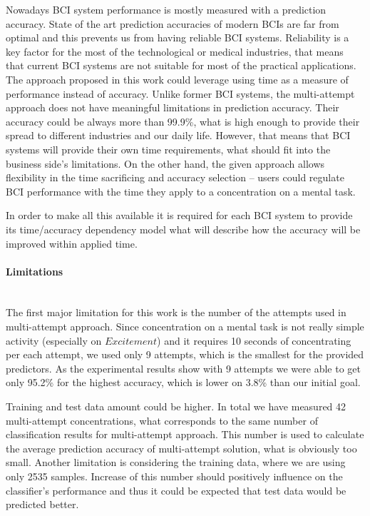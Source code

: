 \documentclass[12pt]{article}
\theoremstyle{definition}
\begin{document}
Nowadays BCI system performance is mostly measured with a prediction accuracy. State of the art prediction accuracies of modern BCIs are far from optimal and this prevents us from having reliable BCI systems. Reliability is a key factor for the most of the technological or medical industries, that means that current BCI systems are not suitable for most of the practical applications. The approach proposed in this work could leverage using time as a measure of performance instead of accuracy. Unlike former BCI systems, the multi-attempt approach does not have meaningful limitations in prediction accuracy. Their accuracy could be always more than 99.9\%, what is high enough to  provide their spread to different industries and our daily life. However, that means that BCI systems will provide their own time requirements, what should fit into the business side's limitations. On the other hand, the given approach allows flexibility in the time sacrificing and accuracy selection -- users could regulate BCI performance with the time they apply to a concentration on a mental task.

In order to make all this available it is required for each BCI system to provide its time/accuracy dependency model what will describe how the accuracy will be improved within applied time. 


\paragraph{Limitations}~\\

The first major limitation for this work is the number of the attempts used in multi-attempt approach. Since concentration on a mental task is not really simple activity (especially on $Excitement$) and it requires 10 seconds of concentrating per each attempt, we used only 9 attempts, which is the smallest for the provided predictors. As the experimental results show with 9 attempts we were able to get only 95.2\% for the highest accuracy, which is lower on 3.8\% than our initial goal.

Training and test data amount could be higher. In total we have measured 42 multi-attempt concentrations, what corresponds to the same number of classification results for multi-attempt approach. This number is used to calculate the average prediction accuracy of multi-attempt solution, what is obviously too small.
Another limitation is considering the training data, where we are using only 2535 samples. Increase of this number should positively influence on the classifier's performance and thus it could be expected that test data would be predicted better.
\end{document}
